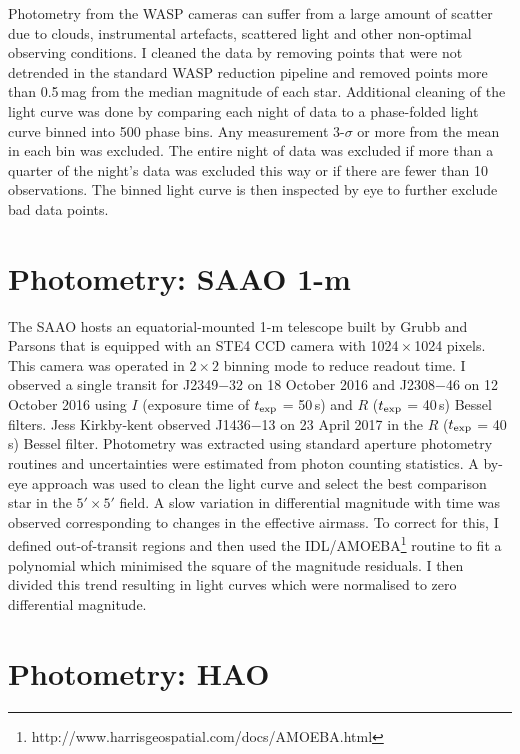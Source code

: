 Photometry from the WASP cameras can suffer from a large amount of scatter due to clouds, instrumental artefacts, scattered light and other non-optimal observing conditions. I cleaned the data by removing points that were not detrended in the standard WASP reduction pipeline and removed points more than 0.5\,mag from the median magnitude of each star. Additional cleaning of the light curve was done by comparing each night of data to a phase-folded light curve binned into 500 phase bins. Any measurement $3$-$ \sigma$ or more from the mean in each bin was excluded. The entire night of data was excluded if more than a quarter of the night's data was excluded this way or if there are fewer than 10 observations. The binned light curve is then inspected by eye to further exclude bad data points.

\section{Photometry: SAAO 1-m}

The SAAO hosts an equatorial-mounted 1-m telescope built by Grubb and Parsons that is equipped with an STE4 CCD camera with 1024\,$\times$\,1024 pixels. This camera was operated in $2 \times 2$ binning mode to reduce readout time. I observed a single transit for J2349$-$32 on 18 October 2016 and J2308$-$46 on  12 October 2016 using $I$ (exposure time of $t_{\rm exp}$ = 50\,s) and $R$ ($t_{\rm exp}$ = 40\,s) Bessel filters. Jess Kirkby-kent observed J1436$-$13 on 23 April 2017 in the $R$ ($t_{\rm exp}$ = 40\,s) Bessel filter. Photometry was extracted using standard aperture photometry routines \citep{Southworth2009} and uncertainties were estimated from photon counting statistics. A by-eye approach was used to clean the light curve and select the best comparison star in the $5' \times 5'$ field. A slow variation in differential magnitude with time was observed corresponding to changes in the effective airmass. To correct for this, I defined out-of-transit regions and then used the IDL/AMOEBA\footnote{http://www.harrisgeospatial.com/docs/AMOEBA.html} routine to fit a polynomial which minimised the square of the magnitude residuals. I then divided this trend resulting in light curves which were normalised to zero differential magnitude.  


\section{Photometry: HAO}

